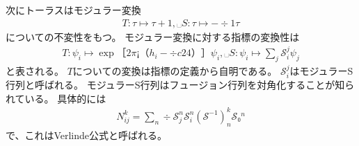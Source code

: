 \documentclass[8pt,unicode,xcolor=svgnames]{beamer}
\makeatletter
\newcommand*{\currentname}{\@currentlabelname}
\numberwithin{equation}{section}
\makeatother
\begin{document}
\begin{frame}{\currentname}
    次にトーラスはモジュラー変換
    \begin{align}
        T: τ ↦ τ+1,␣
        S: τ ↦ -÷1{τ}
    \end{align}
    についての不変性をもつ。
    モジュラー変換に対する指標の変換性は
    \begin{align}
        T: ψ_i ↦ \exp［2π¡（h_i-÷c{24}）］ψ_i,␣
        S: ψ_i ↦ ∑_j 𝒮_i^j ψ_j
    \end{align}
    と表される。
    $T$についての変換は指標の定義から自明である。
    $𝒮_i^j$はモジュラーS行列と呼ばれる。
    モジュラーS行列はフュージョン行列を対角化することが知られている。
    具体的には
    \begin{align}
        N_{ij}^k = ∑_n ÷{𝒮_j^n 𝒮_i^n (𝒮^{-1})_n^k}{𝒮₀^n}
    \end{align}
    で、これはVerlinde公式と呼ばれる。
\end{frame}
\end{document}

